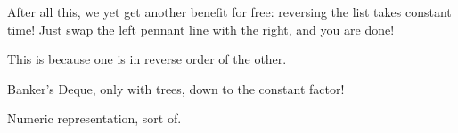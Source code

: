 \documentclass[sigconf]{acmart}
\begin{document}
After all this, we yet get another benefit for free: reversing the list takes
constant time! Just swap the left pennant line with the right, and you are done!

This is because one is in reverse order of the other.

Banker's Deque, only with trees, down to the constant factor!

Numeric representation, sort of.


\begin{itemize}








\end{itemize}
\end{document}
